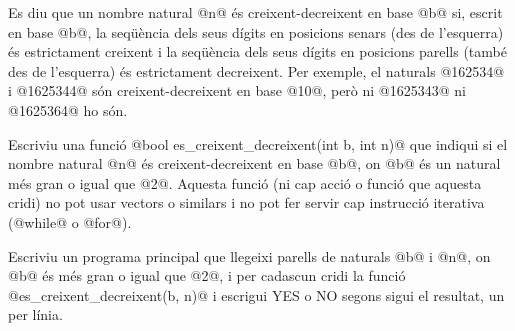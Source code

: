 

\Statement

Es diu que un nombre natural @n@ és creixent-decreixent en base @b@
si, escrit en base @b@, la seqüència dels seus dígits en posicions
senars (des de l'esquerra) és estrictament creixent i la seqüència
dels seus dígits en posicions parells (també des de l'esquerra) és
estrictament decreixent. Per exemple, el naturals @162534@ i @1625344@
són creixent-decreixent en base @10@, però ni @1625343@ ni @1625364@
ho són.

\medskip

Escriviu una funció
@bool es_creixent_decreixent(int b, int n)@
que indiqui si el nombre natu\-ral @n@ és creixent-decreixent en base
@b@, on @b@ és un natural més gran o igual que @2@.  Aquesta funció
(ni cap acció o funció que aquesta cridi) no pot usar vectors o
similars i no pot fer servir cap instrucció iterativa (@while@ o
@for@).

\medskip

Escriviu un programa principal que llegeixi parells de naturals @b@ i
@n@, on @b@ és més gran o igual que @2@, i per cadascun cridi la
funció @es_creixent_decreixent(b, n)@ i escrigui YES o NO segons sigui
el resultat, un per línia.

\SampleTwoCol

